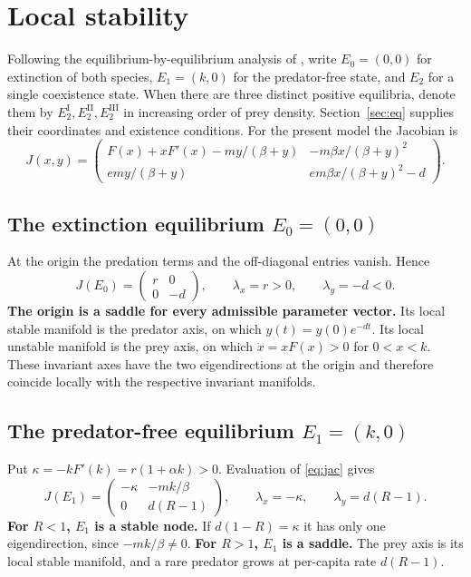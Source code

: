 \documentclass[12pt,a4paper,twoside,fleqn]{article}
\theoremstyle{journal}
\newcommand{\claim}[1]{{\normalfont\bfseries\boldmath #1}}
\begin{document}
\section{Local stability}\label{sec:local}
Following the equilibrium-by-equilibrium analysis of \citet[Sections~3.2.1--3.2.3]{haque11}, write \(E_0=(0,0)\) for extinction of both species, \(E_1=(k,0)\) for the predator-free state, and \(E_2\) for a single coexistence state. When there are three distinct positive equilibria, denote them by \(E_2^{\mathrm I},E_2^{\mathrm{II}},E_2^{\mathrm{III}}\) in increasing order of prey density. Section~\ref{sec:eq} supplies their coordinates and existence conditions. For the present model the Jacobian is
\begin{equation}\label{eq:jac}
 J(x,y)=\begin{pmatrix}
 F(x)+xF'(x)-my/(\beta+y)&-m\beta x/(\beta+y)^2\\
 emy/(\beta+y)&em\beta x/(\beta+y)^2-d
 \end{pmatrix}.
\end{equation}

\subsection{The extinction equilibrium \texorpdfstring{\(E_0=(0,0)\)}{E0}}
At the origin the predation terms and the off-diagonal entries vanish. Hence
\[
 J(E_0)=\begin{pmatrix}r&0\\0&-d\end{pmatrix},
 \qquad \lambda_x=r>0,\qquad \lambda_y=-d<0.
\]
\claim{The origin is a saddle for every admissible parameter vector.} Its local stable manifold is the predator axis, on which \(y(t)=y(0)e^{-dt}\). Its local unstable manifold is the prey axis, on which \(\dot x=xF(x)>0\) for \(0<x<k\). These invariant axes have the two eigendirections at the origin and therefore coincide locally with the respective invariant manifolds.

\subsection{The predator-free equilibrium \texorpdfstring{\(E_1=(k,0)\)}{E1}}
Put \(\kappa=-kF'(k)=r(1+\alpha k)>0\). Evaluation of \eqref{eq:jac} gives
\[
 J(E_1)=\begin{pmatrix}-\kappa&-mk/\beta\\0&d(R-1)\end{pmatrix},
 \qquad \lambda_x=-\kappa,\qquad \lambda_y=d(R-1).
\]
\claim{For \(R<1\), \(E_1\) is a stable node.} If \(d(1-R)=\kappa\) it has only one eigendirection, since \(-mk/\beta\ne0\). \claim{For \(R>1\), \(E_1\) is a saddle.} The prey axis is its local stable manifold, and a rare predator grows at per-capita rate \(d(R-1)\).
\end{document}
